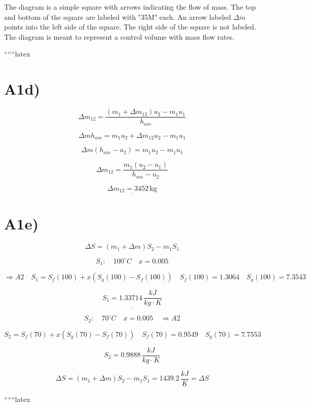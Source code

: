 The diagram is a simple square with arrows indicating the flow of mass. The top and bottom of the square are labeled with "35M" each. An arrow labeled $\Delta \dot{m}$ points into the left side of the square. The right side of the square is not labeled. The diagram is meant to represent a control volume with mass flow rates.

``````latex

\section*{A1d)}

\[
\Delta m_{12} = \frac{(m_1 + \Delta m_{12}) u_2 - m_1 u_1}{h_{am}}
\]

\[
\Delta m h_{am} = m_1 u_2 + \Delta m_{12} u_2 - m_1 u_1
\]

\[
\Delta m (h_{am} - u_2) = m_1 u_2 - m_1 u_1
\]

\[
\Delta m_{12} = \frac{m_1 (u_2 - u_1)}{h_{am} - u_2}
\]

\[
\underline{\Delta m_{12} = 3452 \, \text{kg}}
\]

\section*{A1e)}

\[
\Delta S = (m_1 + \Delta m) S_2 - m_1 S_1
\]

\[
S_1: \quad 100^\circ C \quad x = 0.005
\]

\[
\Rightarrow A2 \quad S_1 = S_f (100) + x (S_g (100) - S_f (100)) \quad S_f (100) = 1.3064 \quad S_g (100) = 7.3543
\]

\[
\underline{S_1 = 1.33714 \, \frac{kJ}{kg \cdot K}}
\]

\[
S_2: \quad 70^\circ C \quad x = 0.005 \quad \Rightarrow A2
\]

\[
S_2 = S_f (70) + x (S_g (70) - S_f (70)) \quad S_f (70) = 0.9549 \quad S_g (70) = 7.7553
\]

\[
S_2 = 0.9888 \, \frac{kJ}{kg \cdot K}
\]

\[
\Delta S = (m_1 + \Delta m) S_2 - m_1 S_1 = \underline{1439.2 \, \frac{kJ}{K} = \Delta S}
\]

``````latex


